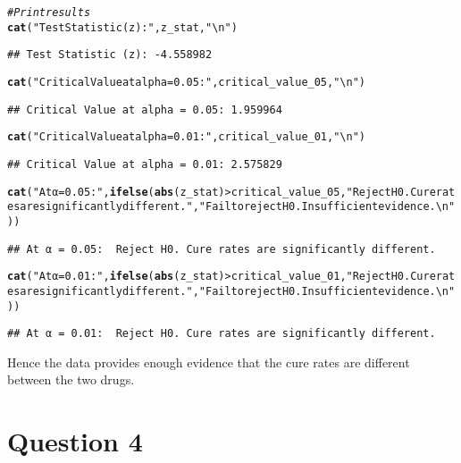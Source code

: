 \documentclass{article}\usepackage[]{graphicx}\usepackage[]{xcolor}
\makeatletter
\newcommand{\hlsng}[1]{\textcolor[rgb]{0.192,0.494,0.8}{#1}}%
\newcommand{\hlcom}[1]{\textcolor[rgb]{0.678,0.584,0.686}{\textit{#1}}}%
\newcommand{\hlopt}[1]{\textcolor[rgb]{0,0,0}{#1}}%
\newcommand{\hldef}[1]{\textcolor[rgb]{0.345,0.345,0.345}{#1}}%
\newcommand{\hlkwd}[1]{\textcolor[rgb]{0.737,0.353,0.396}{\textbf{#1}}}%
\newenvironment{kframe}{%
 \def\at@end@of@kframe{}%
 \ifinner\ifhmode%
  \def\at@end@of@kframe{\end{minipage}}%
  \begin{minipage}{\columnwidth}%
 \fi\fi%
 \def\FrameCommand##1{\hskip\@totalleftmargin \hskip-\fboxsep
 \colorbox{shadecolor}{##1}\hskip-\fboxsep
     \hskip-\linewidth \hskip-\@totalleftmargin \hskip\columnwidth}%
 \MakeFramed {\advance\hsize-\width
   \@totalleftmargin\z@ \linewidth\hsize
   \@setminipage}}%
 {\par\unskip\endMakeFramed%
 \at@end@of@kframe}
\newenvironment{knitrout}{}{} %
\makeatother
\begin{document}
\begin{knitrout}
\begin{kframe}
\begin{alltt}
\hlcom{# Print results}
\hlkwd{cat}\hldef{(}\hlsng{"Test Statistic (z):"}\hldef{, z_stat,} \hlsng{"\textbackslash{}n"}\hldef{)}
\end{alltt}
\begin{verbatim}
## Test Statistic (z): -4.558982
\end{verbatim}
\begin{alltt}
\hlkwd{cat}\hldef{(}\hlsng{"Critical Value at alpha = 0.05:"}\hldef{, critical_value_05,} \hlsng{"\textbackslash{}n"}\hldef{)}
\end{alltt}
\begin{verbatim}
## Critical Value at alpha = 0.05: 1.959964
\end{verbatim}
\begin{alltt}
\hlkwd{cat}\hldef{(}\hlsng{"Critical Value at alpha = 0.01:"}\hldef{, critical_value_01,} \hlsng{"\textbackslash{}n"}\hldef{)}
\end{alltt}
\begin{verbatim}
## Critical Value at alpha = 0.01: 2.575829
\end{verbatim}
\begin{alltt}
\hlkwd{cat}\hldef{(}\hlsng{"At α = 0.05: "}\hldef{,} \hlkwd{ifelse}\hldef{(}\hlkwd{abs}\hldef{(z_stat)} \hlopt{>} \hldef{critical_value_05,} \hlsng{"Reject H0. Cure rates are significantly different."}\hldef{,} \hlsng{"Fail to reject H0. Insufficient evidence.\textbackslash{}n"}\hldef{))}
\end{alltt}
\begin{verbatim}
## At α = 0.05:  Reject H0. Cure rates are significantly different.
\end{verbatim}
\begin{alltt}
\hlkwd{cat}\hldef{(}\hlsng{"At α = 0.01: "}\hldef{,} \hlkwd{ifelse}\hldef{(}\hlkwd{abs}\hldef{(z_stat)} \hlopt{>} \hldef{critical_value_01,} \hlsng{"Reject H0. Cure rates are significantly different."}\hldef{,} \hlsng{"Fail to reject H0. Insufficient evidence.\textbackslash{}n"}\hldef{))}
\end{alltt}
\begin{verbatim}
## At α = 0.01:  Reject H0. Cure rates are significantly different.
\end{verbatim}
\end{kframe}
\end{knitrout}

Hence the data provides enough evidence that the cure rates are different between the two drugs.

\section{Question 4}
\end{document}
